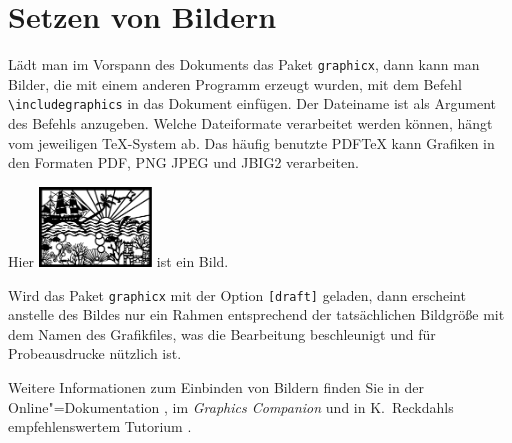 


\section{Setzen von Bildern} \label{graphics}

Lädt man im Vorspann des Dokuments das Paket \texttt{graphicx}, dann kann man
Bilder, die mit einem anderen Programm erzeugt wurden,  mit dem Befehl
\lstinline|\includegraphics| in das Dokument einfügen. Der Dateiname ist als
Argument des Befehls anzugeben. Welche Dateiformate verarbeitet werden können,
hängt vom jeweiligen \TeX-System ab. Das häufig benutzte PDF\TeX{} kann
Grafiken in den Formaten PDF, PNG JPEG und JBIG2 verarbeiten.



\noindent Wird das Paket \texttt{graphicx} mit der Option \texttt{[draft]} geladen,
dann erscheint anstelle des Bildes nur ein Rahmen entsprechend
der tatsächlichen Bildgröße mit dem Namen des Grafikfiles, 
was die Bearbeitung beschleunigt und für Probeausdrucke nützlich ist.

Weitere Informationen zum Einbinden von Bildern finden Sie in der
Online"=Dokumentation \cite{grfguide}, im \textit{Graphics Companion}
\cite{grfcomp} und in K.~Reckdahls empfehlenswertem  Tutorium \cite{epslatex}.



